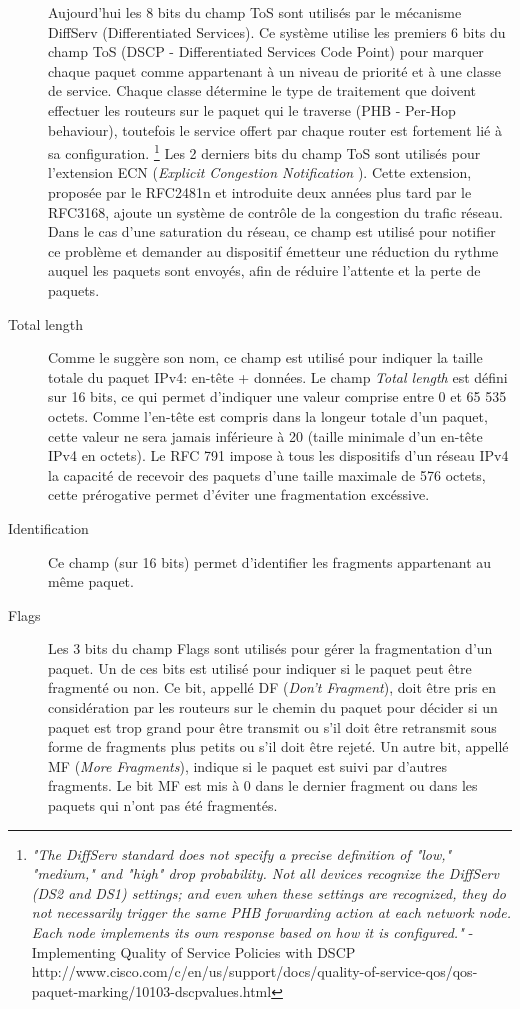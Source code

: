 \begin{description}
Aujourd'hui les 8 bits du champ ToS sont utilisés par le mécanisme DiffServ
(Differentiated Services). Ce système utilise les premiers 6 bits du champ
ToS (DSCP - Differentiated Services Code Point) pour marquer chaque paquet
comme appartenant à un niveau de priorité et à une classe de service. Chaque
classe détermine le type de traitement que doivent effectuer les routeurs sur le paquet qui le traverse
 (PHB - Per-Hop behaviour), toutefois le service offert
par chaque router est fortement lié à sa configuration.
\footnote {
{\it "The DiffServ standard does not specify a precise definition of "low," "medium,"
and "high" drop probability. Not all devices recognize the DiffServ (DS2 and
DS1) settings; and even when these settings are recognized, they do not
necessarily trigger the same PHB forwarding action at each network node. Each
node implements its own response based on how it is configured."} - 
Implementing Quality of Service Policies with DSCP
http://www.cisco.com/c/en/us/support/docs/quality-of-service-qos/qos-paquet-marking/10103-dscpvalues.html}
Les 2 derniers bits du champ ToS sont utilisés pour l'extension ECN ({\it Explicit Congestion
Notification }). Cette extension, proposée par le RFC2481n et introduite deux années plus tard par le RFC3168,
ajoute un système de contrôle de la congestion du trafic réseau. Dans le cas d'une saturation
du réseau, ce champ est utilisé pour notifier ce problème et demander au dispositif émetteur
une réduction du rythme auquel les paquets sont envoyés, afin de réduire l'attente et
la perte de paquets.

\item [Total length]
Comme le suggère son nom, ce champ est utilisé pour indiquer la taille totale du
paquet IPv4: en-tête + données. Le champ {\it Total length} est défini sur 16
bits, ce qui permet d'indiquer une valeur comprise entre 0 et 65 535 octets. Comme l'en-tête
est compris dans la longeur totale d'un paquet, cette valeur ne sera jamais inférieure
à 20 (taille minimale d'un en-tête IPv4 en octets).
Le RFC 791 impose à tous les dispositifs d'un réseau IPv4 la capacité de recevoir
des paquets d'une taille maximale de 576 octets, cette prérogative permet d'éviter une fragmentation excéssive.

\item [Identification]
Ce champ (sur 16 bits) permet d'identifier les fragments appartenant au même paquet.

\item [Flags]
Les 3 bits du champ Flags sont utilisés pour gérer la fragmentation d'un paquet.
Un de ces bits est utilisé pour indiquer si le paquet peut être fragmenté ou
non. Ce bit, appellé DF ({\it Don't Fragment}), doit être pris en considération
par les routeurs sur le chemin du paquet pour décider si un paquet est trop grand pour être
transmit ou s'il doit être retransmit sous forme de fragments plus petits ou s'il doit être rejeté. 
Un autre bit, appellé MF ({\it More Fragments}), indique si le paquet est suivi 
par d'autres fragments. Le bit MF est mis à 0 dans le dernier fragment ou dans
les paquets qui n'ont pas été fragmentés.


\end{description}
